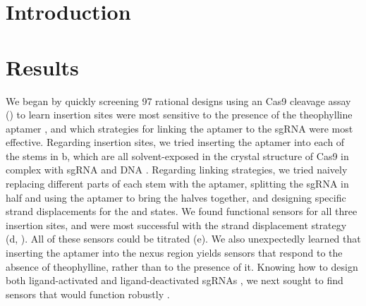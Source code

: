 \documentclass[10pt,oneside]{article}
\begin{document}
\section{Introduction}








\section{Results}





We began by quickly screening 97 rational designs using an \invitro{} Cas9 cleavage assay () to learn insertion sites were most sensitive to the presence of the theophylline aptamer \autocite{jenison1994}, and which strategies for linking the aptamer to the sgRNA were most effective.  Regarding insertion sites, we tried inserting the aptamer into each of the stems in b, which are all solvent-exposed in the crystal structure of Cas9 in complex with sgRNA and DNA \autocite{nishimasu2014}.  Regarding linking strategies, we tried naively replacing different parts of each stem with the aptamer, splitting the sgRNA in half and using the aptamer to bring the halves together, and designing specific strand displacements for the \apo{} and \holo{} states.  We found functional sensors for all three insertion sites, and were most successful with the strand displacement strategy (d, ).  All of these sensors could be titrated (e).  We also unexpectedly learned that inserting the aptamer into the nexus region yields sensors that respond to the absence of theophylline, rather than to the presence of it.  Knowing how to design both ligand-activated and ligand-deactivated sgRNAs \invitro{}, we next sought to find sensors that would function robustly \invivo{}.
\end{document}
